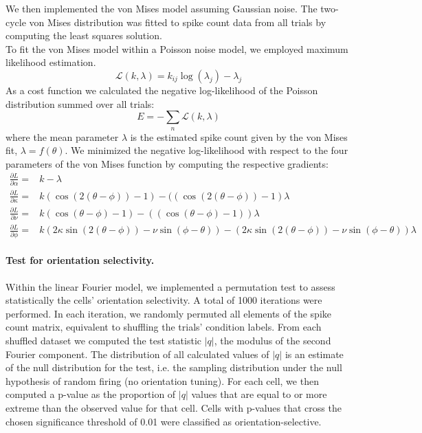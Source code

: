 \documentclass[10pt]{article}
\begin{document}
We then implemented the von Mises model assuming Gaussian noise. The two-cycle von Mises distribution was fitted to spike count data from all trials by computing the least squares solution. \\
To fit the von Mises model within a Poisson noise model, we employed maximum likelihood estimation. 
\begin{equation*}
\mathcal{L}(k,\lambda) = k_{ij}\log(\lambda_j)-\lambda_j
\end{equation*}
As a cost function we calculated the negative log-likelihood of the Poisson distribution summed over all trials: 
\begin{equation}
E = - \sum_n \mathcal{L}(k,\lambda)
\end{equation}
where the mean parameter $\lambda$ is the estimated spike count given by the von Mises fit, $\lambda = f(\theta)$. We minimized the negative log-likelihood with respect to the four parameters of the von Mises function by computing the respective gradients:
\begin{align*}
 \frac{\partial L}{\partial \alpha} = &k - \lambda  \\
 \frac{\partial L}{\partial \kappa} = &k(\cos(2(\theta-\phi))-1) - ((\cos(2(\theta-\phi))-1) \lambda \\
 \frac{\partial L}{\partial \nu} = &k(\cos(\theta-\phi)-1) - ((\cos(\theta-\phi)-1)) \lambda \\
 \frac{\partial L}{\partial \phi} =  & k(2\kappa \sin(2(\theta-\phi)) - \nu \sin(\phi-\theta)) -(2\kappa \sin(2(\theta-\phi))- \nu \sin(\phi-\theta)) \lambda
\end{align*}
\paragraph{Test for orientation selectivity.} Within the linear Fourier model, we implemented a permutation test to assess statistically the cells' orientation selectivity. A total of 1000 iterations were performed. In each iteration, we randomly permuted all elements of the spike count matrix, equivalent to shuffling the trials' condition labels. From each shuffled dataset we computed the test statistic $|q|$, the modulus of the second Fourier component. The distribution of all calculated values of $|q|$ is an estimate of the null distribution for the test, i.e. the sampling distribution under the null hypothesis of random firing (no orientation tuning). For each cell, we then computed a p-value as the proportion of $|q|$ values that are equal to or more extreme than the observed value for that cell. Cells with p-values that cross the chosen significance threshold of 0.01 were classified as orientation-selective.
\end{document}
